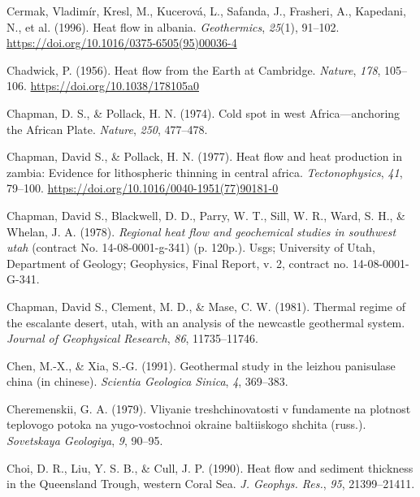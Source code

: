 \documentclass[draft,linenumbers]{agujournal2018}
\begin{document}
\leavevmode{}%
Cermak, Vladimír, Kresl, M., Kucerová, L., Safanda, J., Frasheri, A.,
Kapedani, N., et al. (1996). Heat flow in albania. \emph{Geothermics},
\emph{25}(1), 91--102.
\url{https://doi.org/10.1016/0375-6505(95)00036-4}

\leavevmode{}%
Chadwick, P. (1956). Heat flow from the {Earth} at {Cambridge}.
\emph{Nature}, \emph{178}, 105--106.
\url{https://doi.org/10.1038/178105a0}

\leavevmode{}%
Chapman, D. S., \& Pollack, H. N. (1974). Cold spot in west
{Africa}---anchoring the {African Plate}. \emph{Nature}, \emph{250},
477--478.

\leavevmode{}%
Chapman, David S., \& Pollack, H. N. (1977). Heat flow and heat
production in zambia: Evidence for lithospheric thinning in central
africa. \emph{Tectonophysics}, \emph{41}, 79--100.
\url{https://doi.org/10.1016/0040-1951(77)90181-0}

\leavevmode{}%
Chapman, David S., Blackwell, D. D., Parry, W. T., Sill, W. R., Ward, S.
H., \& Whelan, J. A. (1978). \emph{Regional heat flow and geochemical
studies in southwest utah} (contract No. 14-08-0001-g-341) (p. 120p.).
Usgs; University of Utah, Department of Geology; Geophysics, Final
Report, v. 2, contract no. 14-08-0001-G-341.

\leavevmode{}%
Chapman, David S., Clement, M. D., \& Mase, C. W. (1981). Thermal regime
of the escalante desert, utah, with an analysis of the newcastle
geothermal system. \emph{Journal of Geophysical Research}, \emph{86},
11735--11746.

\leavevmode{}%
Chen, M.-X., \& Xia, S.-G. (1991). Geothermal study in the leizhou
panisulase china (in chinese). \emph{Scientia Geologica Sinica},
\emph{4}, 369--383.

\leavevmode{}%
Cheremenskii, G. A. (1979). Vliyanie treshchinovatosti v fundamente na
plotnost teplovogo potoka na yugo-vostochnoi okraine baltiiskogo shchita
(russ.). \emph{Sovetskaya Geologiya}, \emph{9}, 90--95.

\leavevmode{}%
Choi, D. R., Liu, Y. S. B., \& Cull, J. P. (1990). Heat flow and
sediment thickness in the {Queensland Trough, western Coral Sea}.
\emph{J. Geophys. Res.}, \emph{95}, 21399--21411.
\end{document}

